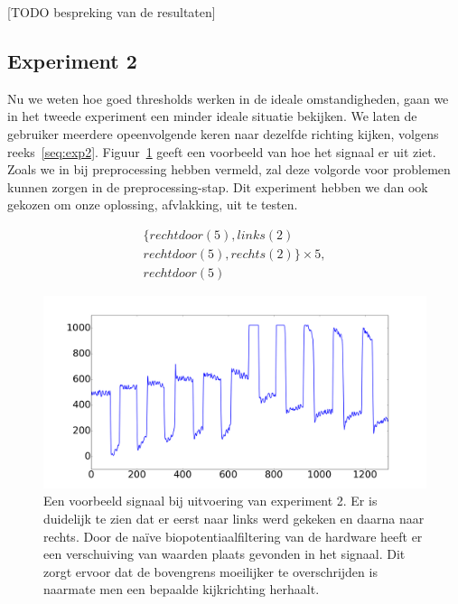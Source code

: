 \documentclass{article}
\begin{document}
[TODO bespreking van de resultaten]

\subsection{Experiment 2}

Nu we weten hoe goed thresholds werken in de ideale omstandigheden, gaan we in het tweede experiment een minder ideale situatie bekijken. We laten de gebruiker meerdere opeenvolgende keren naar dezelfde richting kijken, volgens reeks~\ref{seq:exp2}. Figuur~\ref{fig:exp2} geeft een voorbeeld van hoe het signaal er uit ziet. Zoals we in bij preprocessing hebben vermeld, zal deze volgorde voor problemen kunnen zorgen in de preprocessing-stap. Dit experiment hebben we dan ook gekozen om onze oplossing, afvlakking, uit te testen.

\begin{equation}
\begin{aligned}
\label{seq:exp2}
& \{rechtdoor(5), links(2) & \\
& rechtdoor(5), rechts(2)\} \times 5,& \\
& rechtdoor(5) &
\end{aligned}
\end{equation}


\begin{figure}[h]
\centering
\includegraphics[width=\linewidth]{images/experiment2}
\caption{Een voorbeeld signaal bij uitvoering van experiment 2. Er is duidelijk te zien dat er eerst naar links werd gekeken en daarna naar rechts. Door de naïve biopotentiaalfiltering van de hardware heeft er een verschuiving van waarden plaats gevonden in het signaal. Dit zorgt ervoor dat de bovengrens moeilijker te overschrijden is naarmate men een bepaalde kijkrichting herhaalt.}
\label{fig:exp2}
\end{figure}
\end{document}

